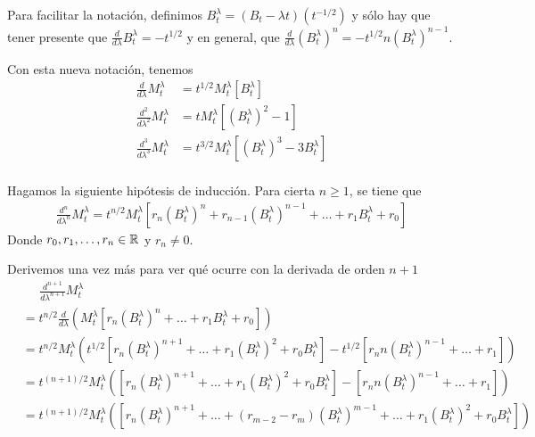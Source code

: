 Para facilitar la notación, definimos $B_t^\lambda = (B_t - \lambda t) (t^{-1/2})$ y sólo hay 
que tener presente que $\frac{d}{d\lambda} B_t^\lambda = -t^{1/2}$ y en general, que 
$\frac{d}{d\lambda} (B_t^\lambda)^n = -t^{1/2} n (B_t^\lambda)^{n-1}$.\pn

Con esta nueva notación, tenemos
\begin{align}
    \frac{d}{d\lambda}  M_t^\lambda     &= t^{1/2} M_t^\lambda \left[ B_t^\lambda \right]                       \\
    \frac{d^2}{d\lambda^2}  M_t^\lambda &= t M_t^\lambda \left[ (B_t^\lambda)^2 - 1  \right]                    \\
    \frac{d^3}{d\lambda^3}  M_t^\lambda &= t^{3/2} M_t^\lambda \left[ (B_t^\lambda)^3 - 3 B_t^\lambda  \right]  \\
\end{align}\pn

Hagamos la siguiente hipótesis de inducción. Para cierta $n \geq 1$, se tiene que 
\begin{align}
    \frac{d^n}{d\lambda^n} M_t^\lambda = t^{n/2} M_t^\lambda \left[ r_n (B_t^\lambda)^n + r_{n-1} (B_t^\lambda)^{n-1} + \dots + r_1 B_t^\lambda + r_0 \right]
\end{align}
Donde $r_0, r_1, \dots, r_n \in \mathbb{R}$ y $r_n \neq 0$.\pn

Derivemos una vez más para ver qué ocurre con la derivada de orden $n+1$
\tiny
\begin{align}
    & \;\;\;\;\;\frac{d^{n+1}}{d\lambda^{n+1}} M_t^\lambda                                                                                                                                                                                      \\
    &= t^{n/2} \frac{d}{d \lambda} \left( M_t^\lambda \left[ r_n (B_t^\lambda)^n + \dots + r_1 B_t^\lambda + r_0 \right] \right)                                                                                                                \\
    &= t^{n/2}  M_t^\lambda \left( t^{1/2} \left[ r_n (B_t^\lambda)^{n+1}  + \dots + r_1 (B_t^\lambda)^2 + r_0 B_t^\lambda \right] -t^{1/2} \left[ r_n n (B_t^\lambda)^{n-1} + \dots + r_1 \right]\right)                                       \\
    &= t^{(n+1)/2}  M_t^\lambda \left( \left[ r_n (B_t^\lambda)^{n+1}  + \dots + r_1 (B_t^\lambda)^2 + r_0 B_t^\lambda \right] - \left[ r_n n (B_t^\lambda)^{n-1} + \dots + r_1 \right]\right)                                                  \\
    &= t^{(n+1)/2}  M_t^\lambda \left( \left[ r_n (B_t^\lambda)^{n+1}  + \dots + (r_{m-2} - r_{m})(B_t^\lambda)^{m-1} + \dots + r_1 (B_t^\lambda)^2 + r_0 B_t^\lambda \right]\right) 
\end{align}\pn
\normalsize

